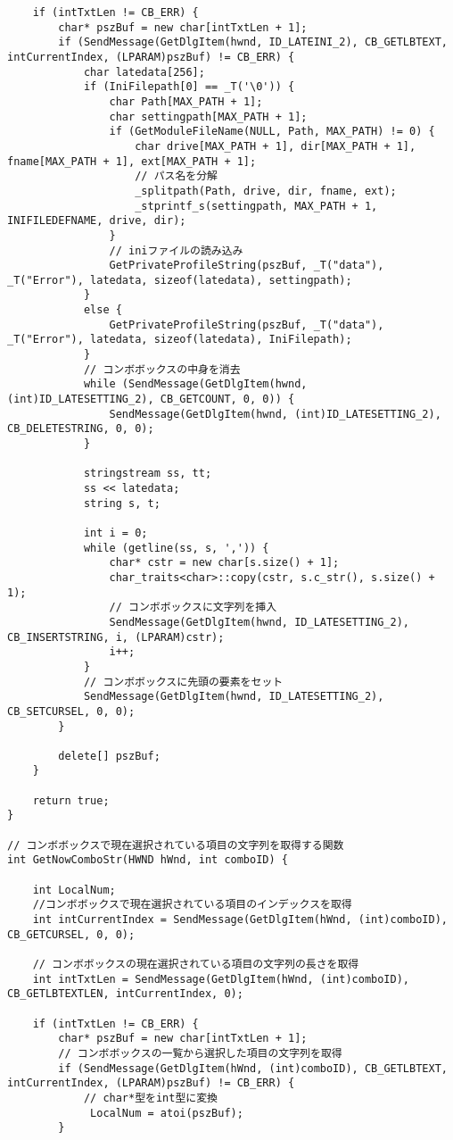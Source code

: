 \begin{verbatim}
	if (intTxtLen != CB_ERR) {
		char* pszBuf = new char[intTxtLen + 1];
		if (SendMessage(GetDlgItem(hwnd, ID_LATEINI_2), CB_GETLBTEXT, intCurrentIndex, (LPARAM)pszBuf) != CB_ERR) {
			char latedata[256];
			if (IniFilepath[0] == _T('\0')) {
				char Path[MAX_PATH + 1];
				char settingpath[MAX_PATH + 1];
				if (GetModuleFileName(NULL, Path, MAX_PATH) != 0) {
					char drive[MAX_PATH + 1], dir[MAX_PATH + 1], fname[MAX_PATH + 1], ext[MAX_PATH + 1];
					// パス名を分解
					_splitpath(Path, drive, dir, fname, ext);
					_stprintf_s(settingpath, MAX_PATH + 1, INIFILEDEFNAME, drive, dir);
				}
				// iniファイルの読み込み
				GetPrivateProfileString(pszBuf, _T("data"), _T("Error"), latedata, sizeof(latedata), settingpath);
			}
			else {
				GetPrivateProfileString(pszBuf, _T("data"), _T("Error"), latedata, sizeof(latedata), IniFilepath);
			}
			// コンボボックスの中身を消去
			while (SendMessage(GetDlgItem(hwnd, (int)ID_LATESETTING_2), CB_GETCOUNT, 0, 0)) {
				SendMessage(GetDlgItem(hwnd, (int)ID_LATESETTING_2), CB_DELETESTRING, 0, 0);
			}

			stringstream ss, tt;
			ss << latedata;
			string s, t;

			int i = 0;
			while (getline(ss, s, ',')) {
				char* cstr = new char[s.size() + 1];
				char_traits<char>::copy(cstr, s.c_str(), s.size() + 1);
				// コンボボックスに文字列を挿入
				SendMessage(GetDlgItem(hwnd, ID_LATESETTING_2), CB_INSERTSTRING, i, (LPARAM)cstr);
				i++;
			}
			// コンボボックスに先頭の要素をセット
			SendMessage(GetDlgItem(hwnd, ID_LATESETTING_2), CB_SETCURSEL, 0, 0);
		}

		delete[] pszBuf;
	}

	return true;
}

// コンボボックスで現在選択されている項目の文字列を取得する関数
int GetNowComboStr(HWND hWnd, int comboID) {

	int LocalNum;
	//コンボボックスで現在選択されている項目のインデックスを取得
	int intCurrentIndex = SendMessage(GetDlgItem(hWnd, (int)comboID), CB_GETCURSEL, 0, 0);

	// コンボボックスの現在選択されている項目の文字列の長さを取得
	int intTxtLen = SendMessage(GetDlgItem(hWnd, (int)comboID), CB_GETLBTEXTLEN, intCurrentIndex, 0);

	if (intTxtLen != CB_ERR) {
		char* pszBuf = new char[intTxtLen + 1];
		// コンボボックスの一覧から選択した項目の文字列を取得
		if (SendMessage(GetDlgItem(hWnd, (int)comboID), CB_GETLBTEXT, intCurrentIndex, (LPARAM)pszBuf) != CB_ERR) {
			// char*型をint型に変換
			 LocalNum = atoi(pszBuf);
		}


\end{verbatim}
